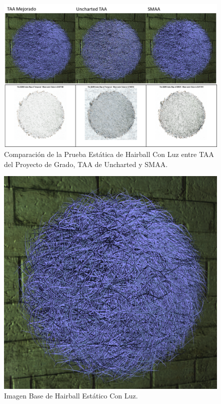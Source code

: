 \documentclass[pregrado]{tesis-usb} %
\begin{document}
\begin{figure}[!htb]
	\centering
	\includegraphics[scale=0.8]{images/results/hairball_static_lighted.png}
	\caption{Comparación de la Prueba Estática de Hairball Con Luz entre TAA del Proyecto de Grado, TAA de Uncharted y SMAA.}\label{fig:hairball_static_lighted_render}
\end{figure}

\begin{figure}[!htb]
	\centering
	\includegraphics[scale=0.2]{images/results/hairball_light_sobel_ground_truth.png}
	\caption{Imagen Base de Hairball Estático Con Luz.}\label{fig:hairball_static_lighted_truth}
\end{figure}
\end{document}
